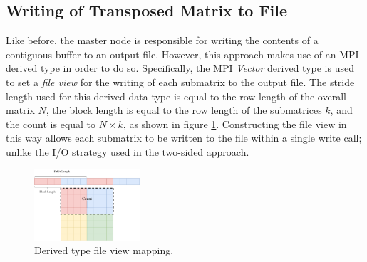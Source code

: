\documentclass[journal,10pt,a4paper]{IEEEtran}
\begin{document}
\subsection{Writing of Transposed Matrix to File}

Like before, the master node is responsible for writing the contents of a contiguous buffer to an output file. However, this approach makes use of an MPI derived type in order to do so. Specifically, the MPI \textit{Vector} derived type is used to set a \textit{file view} for the writing of each submatrix to the output file. The stride length used for this derived data type is equal to the row length of the overall matrix $N$, the block length is equal to the row length of the submatrices $k$, and the count is equal to $N \times k$, as shown in figure \ref{fig:stride}. Constructing the file view in this way allows each submatrix to be written to the file within a single write call; unlike the I/O strategy used in the two-sided approach. 


\begin{figure}[H]
    \centering
    \includegraphics[width=0.35\textwidth]{stride.pdf}
    \caption{Derived type file view mapping.}
    \label{fig:stride}
\end{figure}


\end{document}
